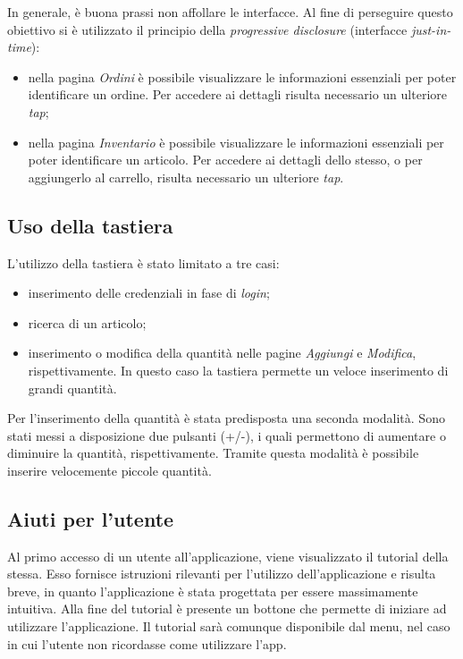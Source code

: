 \documentclass[12pt, a4paper, titlepage]{report}
\begin{document}
	In generale, è buona prassi non affollare le interfacce. Al fine di perseguire questo obiettivo si è utilizzato il principio della \textit{progressive disclosure} (interfacce \textit{just-in-time}):
	\begin{itemize}
		\item nella pagina \textit{Ordini} è possibile visualizzare le informazioni essenziali per poter identificare un ordine. Per accedere ai dettagli risulta necessario un ulteriore \textit{tap};
		\item nella pagina \textit{Inventario} è possibile visualizzare le informazioni essenziali per poter identificare un articolo. Per accedere ai dettagli dello stesso, o per aggiungerlo al carrello, risulta necessario un ulteriore \textit{tap}.
	\end{itemize}
	
	\subsection{Uso della tastiera} \label{tast}
	
	L'utilizzo della tastiera è stato limitato a tre casi:
	\begin{itemize}
		\item inserimento delle credenziali in fase di \textit{login};
		\item ricerca di un articolo;
		\item inserimento o modifica della quantità nelle pagine \textit{Aggiungi} e \textit{Modifica}, rispettivamente. In questo caso la tastiera permette un veloce inserimento di grandi quantità.
	\end{itemize}
	Per l'inserimento della quantità è stata predisposta una seconda modalità. Sono stati messi a disposizione due pulsanti (+/-), i quali permettono di aumentare o diminuire la quantità, rispettivamente. Tramite questa modalità è possibile inserire velocemente piccole quantità.
	
	\subsection{Aiuti per l'utente}
	
	Al primo accesso di un utente all'applicazione, viene visualizzato il tutorial della stessa. Esso fornisce istruzioni rilevanti per l'utilizzo dell'applicazione e risulta breve, in quanto l'applicazione è stata progettata per essere massimamente intuitiva. Alla fine del tutorial è presente un bottone che permette di iniziare ad utilizzare l'applicazione. Il tutorial sarà comunque disponibile dal menu, nel caso in cui l'utente non ricordasse come utilizzare l'app.
	
\end{document}
